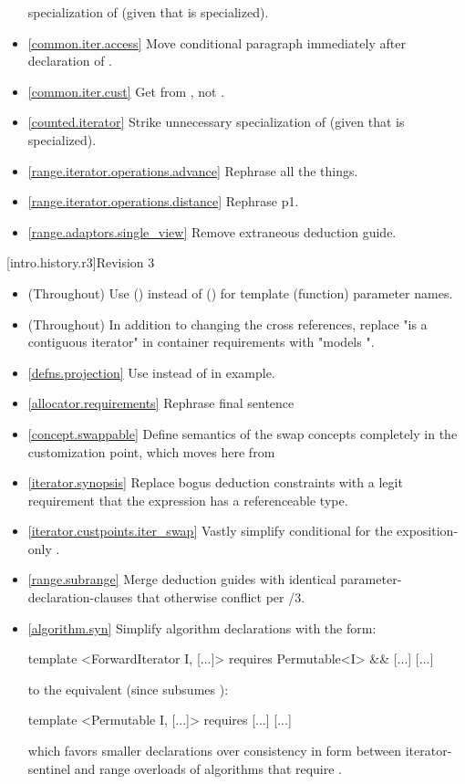 \begin{itemize}
  specialization of 
  (given that  is specialized).
\item \ref{common.iter.access} Move conditional  paragraph
  immediately after declaration of .
\item \ref{common.iter.cust} Get  from , not .
\item \ref{counted.iterator} Strike unnecessary specialization of
   (given that  is specialized).
\item \ref{range.iterator.operations.advance} Rephrase all the things.
\item \ref{range.iterator.operations.distance} Rephrase p1.
\item \ref{range.adaptors.single_view} Remove extraneous 
  deduction guide.
\end{itemize}

[intro.history.r3]{Revision 3}
\begin{itemize}
\item (Throughout) Use  () instead of  () for
   template (function) parameter names.
\item (Throughout) In addition to changing the cross references, replace
  "is a contiguous iterator" in container requirements with "models
  ".
\item \ref{defns.projection} Use  instead of 
  in example.
\item \ref{allocator.requirements} Rephrase final sentence
\item \ref{concept.swappable} Define semantics of the swap concepts completely in
  the  customization point, which moves here from 
\item \ref{iterator.synopsis} Replace bogus 
  deduction constraints with a legit requirement that the expression has
  a referenceable type.
\item \ref{iterator.custpoints.iter_swap} Vastly simplify conditional
   for the exposition-only .
\item \ref{range.subrange} Merge  deduction guides with identical
  parameter-declaration-clauses that otherwise conflict per
  /3.
\item \ref{algorithm.syn} Simplify algorithm declarations with the form:
\begin{codeblock}
template <ForwardIterator I, [...]>
  requires Permutable<I> && [...]
[...]
\end{codeblock}
to the equivalent (since  subsumes ):
\begin{codeblock}
template <Permutable I, [...]>
  requires [...]
[...]
\end{codeblock}
which favors smaller declarations over consistency in form between
iterator-sentinel and range overloads of algorithms that require
.
\end{itemize}


